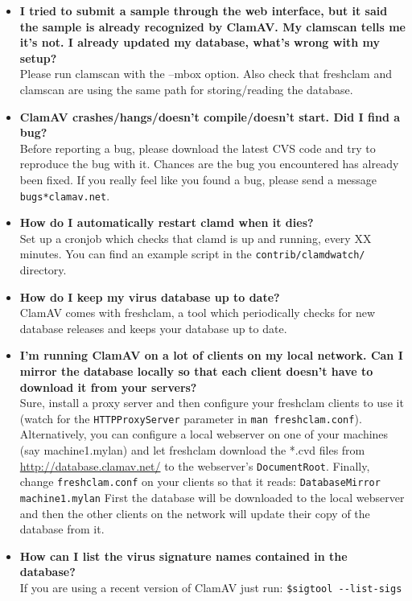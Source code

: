 \documentclass[a4paper,titlepage,12pt]{article}
\newcommand{\email}[1]{\texttt{#1}}
\begin{document}
\begin{itemize}
	\item \textbf{I tried to submit a sample through the web interface,
	but it said the sample is already recognized by ClamAV. My clamscan
	tells me it's not. I already updated my database, what's wrong with
	my setup?}\\
	Please run clamscan with the --mbox option. Also check that freshclam
	and clamscan are using the same path for storing/reading the database.

	\item \textbf{ClamAV crashes/hangs/doesn't compile/doesn't start. Did
	I find a bug?}\\
	Before reporting a bug, please download the latest CVS code and try to
	reproduce the bug with it. Chances are the bug you encountered has
	already been fixed. If you really feel like you found a bug, please
	send a message \email{bugs*clamav.net}.

	\item \textbf{How do I automatically restart clamd when it dies?}\\
	Set up a cronjob which checks that clamd is up and running, every XX
	minutes. You can find an example script in the
	\verb+contrib/clamdwatch/+ directory.

	\item \textbf{How do I keep my virus database up to date?}\\
	ClamAV comes with freshclam, a tool which periodically checks for
	new database releases and keeps your database up to date.

	\item \textbf{I'm running ClamAV on a lot of clients on my local
	network. Can I mirror the database locally so that each client
	doesn't have to download it from your servers?}\\
	Sure, install a proxy server and then configure your freshclam clients
	to use it (watch for the \verb+HTTPProxyServer+ parameter in
	\verb+man freshclam.conf+). Alternatively, you can configure a local
	webserver on one of your machines (say machine1.mylan) and let
	freshclam download the *.cvd files from
	\url{http://database.clamav.net/} to the webserver's
	\verb+DocumentRoot+. Finally, change \verb+freshclam.conf+ on your
	clients so that it reads: \verb+DatabaseMirror machine1.mylan+
	First the database will be downloaded to the local webserver and then
	the other clients on the network will update their copy of the database
	from it.

	\item \textbf{How can I list the virus signature names contained in
	the database?}\\
	If you are using a recent version of ClamAV just run:
	\verb+$sigtool --list-sigs+


\end{itemize}
\end{document}
